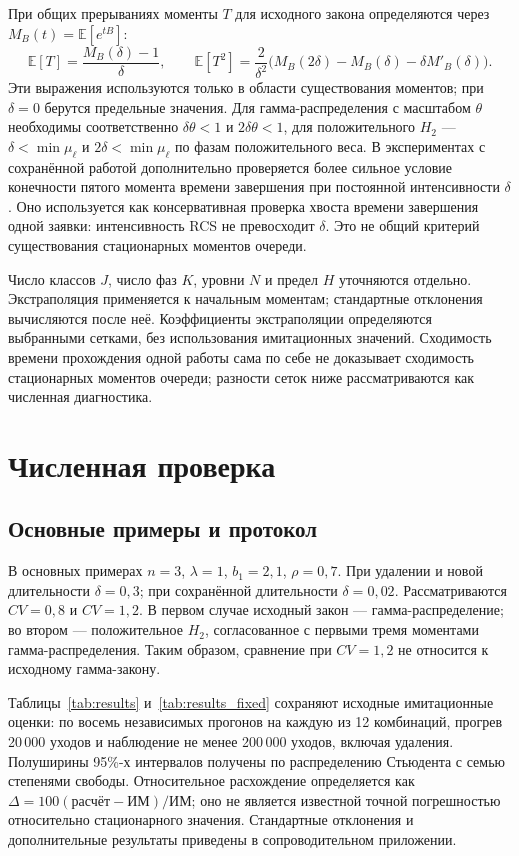 \documentclass[a4paper,12pt]{article}
\begin{document}
При общих прерываниях моменты \(T\) для исходного закона определяются через \(M_B(t)=\mathbb E[e^{tB}]\):
\[
\mathbb E[T]=\frac{M_B(\delta)-1}{\delta},\qquad
\mathbb E[T^2]=\frac{2}{\delta^2}\bigl(M_B(2\delta)-M_B(\delta)-\delta M'_B(\delta)\bigr).
\]
Эти выражения используются только в области существования моментов; при \(\delta=0\) берутся предельные значения. Для гамма-распределения с масштабом \(\theta\) необходимы соответственно \(\delta\theta<1\) и \(2\delta\theta<1\), для положительного \(H_2\) --- \(\delta<\min\mu_\ell\) и \(2\delta<\min\mu_\ell\) по фазам положительного веса. В экспериментах с сохранённой работой дополнительно проверяется более сильное условие конечности пятого момента времени завершения при постоянной интенсивности \(\delta\). Оно используется как консервативная проверка хвоста времени завершения одной заявки: интенсивность RCS не превосходит \(\delta\). Это не общий критерий существования стационарных моментов очереди.

Число классов \(J\), число фаз \(K\), уровни \(N\) и предел \(H\) уточняются отдельно. Экстраполяция применяется к начальным моментам; стандартные отклонения вычисляются после неё. Коэффициенты экстраполяции определяются выбранными сетками, без использования имитационных значений. Сходимость времени прохождения одной работы сама по себе не доказывает сходимость стационарных моментов очереди; разности сеток ниже рассматриваются как численная диагностика.

\section{Численная проверка}\label{sec:results}
\subsection{Основные примеры и протокол}
В основных примерах \(n=3\), \(\lambda=1\), \(b_1=2{,}1\), \(\rho=0{,}7\). При удалении и новой длительности \(\delta=0{,}3\); при сохранённой длительности \(\delta=0{,}02\). Рассматриваются \(CV=0{,}8\) и \(CV=1{,}2\). В первом случае исходный закон --- гамма-распределение; во втором --- положительное \(H_2\), согласованное с первыми тремя моментами гамма-распределения. Таким образом, сравнение при \(CV=1{,}2\) не относится к исходному гамма-закону.

Таблицы~\ref{tab:results} и~\ref{tab:results_fixed} сохраняют исходные имитационные оценки: по восемь независимых прогонов на каждую из 12 комбинаций, прогрев 20\,000 уходов и наблюдение не менее 200\,000 уходов, включая удаления. Полуширины 95\%-х интервалов получены по распределению Стьюдента с семью степенями свободы. Относительное расхождение определяется как \(\Delta=100(\text{расчёт}-\text{ИМ})/\text{ИМ}\); оно не является известной точной погрешностью относительно стационарного значения. Стандартные отклонения и дополнительные результаты приведены в сопроводительном приложении.
\end{document}
